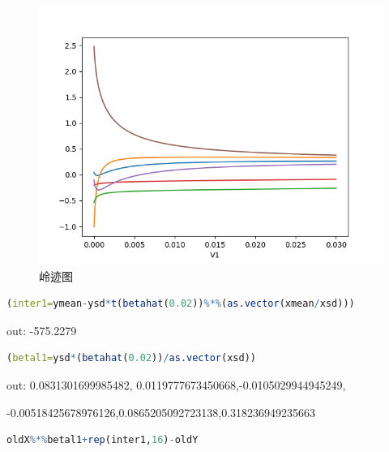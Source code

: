 \documentclass[a4paper,12pt]{article}
\begin{document}
\begin{figure}[htbp]
	\centering
	\includegraphics[scale=0.45]{lingji.png}
	\caption{岭迹图}
\end{figure}

\begin{lstlisting}[language=r,breaklines]
(inter1=ymean-ysd*t(betahat(0.02))%*%(as.vector(xmean/xsd)))
\end{lstlisting}
out: -575.2279

\begin{lstlisting}[language=r,breaklines]
(betal1=ysd*(betahat(0.02))/as.vector(xsd))
\end{lstlisting}

out: 0.0831301699985482, 0.0119777673450668,-0.0105029944945249,

-0.00518425678976126,0.0865205092723138,0.318236949235663

\begin{lstlisting}[language=r,breaklines]
oldX%*%betal1+rep(inter1,16)-oldY
\end{lstlisting}
\end{document}
